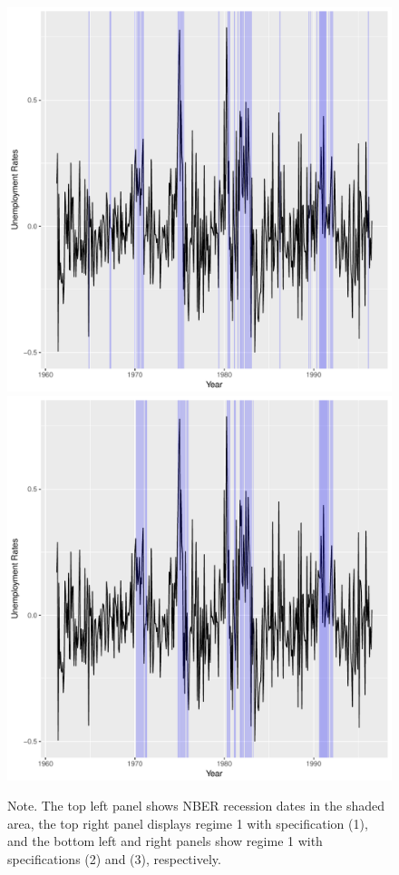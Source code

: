 \documentclass[12pt, reqno]{amsart}
\begin{document}
\begin{figure}[htbp]
\begin{center}
		\includegraphics[scale=0.37]{UR_F1.pdf}
		\includegraphics[scale=0.37]{UR_all.pdf}
	\end{center}

\parbox{6in}{Note. The top left panel shows NBER recession dates in the shaded area, 
the top right panel displays regime 1 with specification (1),
and
the bottom left and right panels show regime 1 with specifications (2) and (3), respectively.}
\end{figure}
\end{document}
